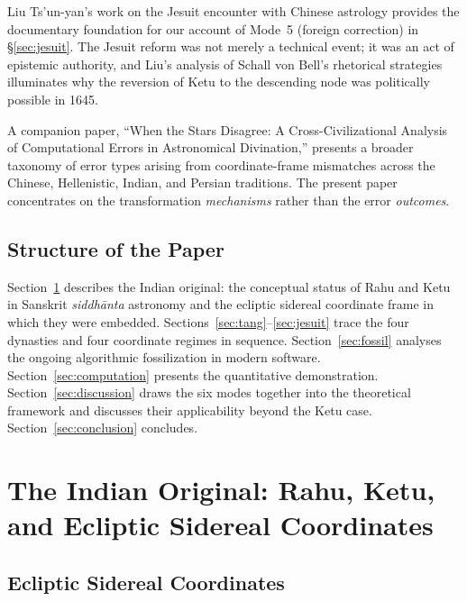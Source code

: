 \documentclass[10pt,a4paper]{article}
\begin{document}
Liu Ts'un-yan's work on the Jesuit encounter with Chinese astrology
\cite{liu2020missionary} provides the documentary foundation for our account of
Mode~5 (foreign correction) in \S\ref{sec:jesuit}.  The Jesuit reform was not
merely a technical event; it was an act of epistemic authority, and Liu's analysis
of Schall von Bell's rhetorical strategies illuminates why the reversion of Ketu
to the descending node was politically possible in 1645.

A companion paper, ``When the Stars Disagree: A Cross-Civilizational Analysis
of Computational Errors in Astronomical Divination,'' presents a broader taxonomy
of error types arising from coordinate-frame mismatches across the Chinese,
Hellenistic, Indian, and Persian traditions.  The present paper concentrates on
the transformation \emph{mechanisms} rather than the error \emph{outcomes}.

\subsection*{Structure of the Paper}

Section~\ref{sec:indian} describes the Indian original: the conceptual status of
Rahu and Ketu in Sanskrit \textit{siddh\=anta} astronomy and the ecliptic sidereal
coordinate frame in which they were embedded.  Sections~\ref{sec:tang}--\ref{sec:jesuit}
trace the four dynasties and four coordinate regimes in sequence.
Section~\ref{sec:fossil} analyses the ongoing algorithmic fossilization in modern
software.  Section~\ref{sec:computation} presents the quantitative demonstration.
Section~\ref{sec:discussion} draws the six modes together into the theoretical
framework and discusses their applicability beyond the Ketu case.
Section~\ref{sec:conclusion} concludes.

\section{The Indian Original: Rahu, Ketu, and Ecliptic Sidereal Coordinates}
\label{sec:indian}

\subsection*{Ecliptic Sidereal Coordinates}
\end{document}
